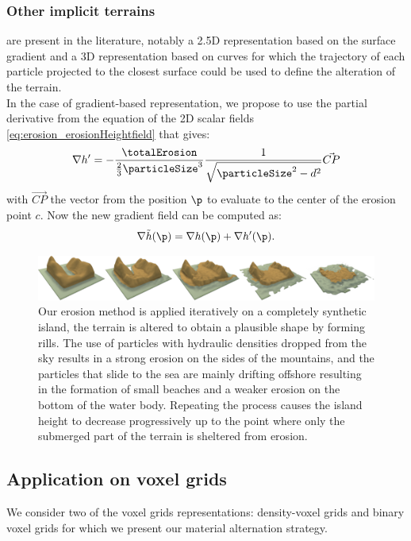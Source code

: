 \subsubsection{Other implicit terrains}
\label{sec:erosion_application_on_other_implicit}
are present in the literature, notably a 2.5D representation based on the surface gradient \cite{Guerin2022} and a 3D representation based on curves \cite{Becher2017} for which the trajectory of each particle projected to the closest surface could be used to define the alteration of the terrain.\\
In the case of gradient-based representation, we propose to use the partial derivative from the equation of the 2D scalar fields \eqref{eq:erosion_erosionHeightfield} that gives:
\begin{align} %
\nabla h' = - \frac{\totalErosion}{\frac{2}{3}\particleSize^3} \frac{1}{\sqrt{\particleSize^2 - d^2} } \vec{CP}
\end{align}
with $\vec{CP}$ the vector from the position $\p$ to evaluate to the center of the erosion point $c$.
Now the new gradient field can be computed as: 
$$
\nabla \Tilde{h}(\p) = \nabla h(\p) + \nabla h'(\p).
$$
\begin{figure}
\centering
\includegraphics{figures/new_continuous_erosion2.png}
\caption{Our erosion method is applied iteratively on a completely synthetic island, the terrain is altered to obtain a plausible shape by forming rills. The use of particles with hydraulic densities dropped from the sky results in a strong erosion on the sides of the mountains, and the particles that slide to the sea are mainly drifting offshore resulting in the formation of small beaches and a weaker erosion on the bottom of the water body. Repeating the process causes the island height to decrease progressively up to the point where only the submerged part of the terrain is sheltered from erosion.}
\label{fig:erosion_continuous-erosion}

\end{figure}

\subsection{Application on voxel grids}
\label{sec:erosion_application_on_voxels}
We consider two of the voxel grids representations: density-voxel grids and binary voxel grids for which we present our material alternation strategy.

